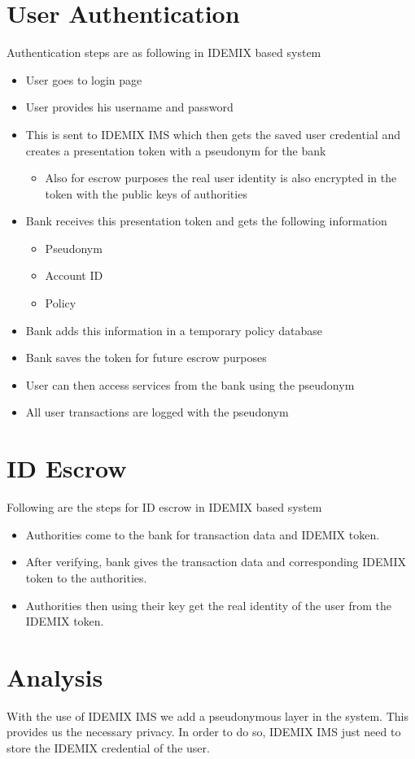 \section{User Authentication}
Authentication steps are as following in IDEMIX based system
\begin{itemize}
	\item User goes to login page
	\item User provides his username and password
	\item This is sent to IDEMIX IMS which then gets the saved user credential and creates a presentation token with a pseudonym for the bank
	\begin{itemize}
		\item Also for escrow purposes the real user identity is also encrypted in the token with the public keys of authorities
	\end{itemize}
	\item Bank receives this presentation token and gets the following information
	\begin{itemize}
		\item Pseudonym
		\item Account ID
		\item Policy
	\end{itemize}
	\item Bank adds this information in a temporary policy database
	\item Bank saves the token for future escrow purposes
	\item User can then access services from the bank using the pseudonym
	\item All user transactions are logged with the pseudonym
\end{itemize}
\section{ID Escrow}
Following are the steps for ID escrow in IDEMIX based system
\begin{itemize}
	\item Authorities come to the bank for transaction data and IDEMIX token.
	\item After verifying, bank gives the transaction data and corresponding IDEMIX token to the authorities.
	\item Authorities then using their key get the real identity of the user from the IDEMIX token.
\end{itemize}
\section{Analysis}
With the use of IDEMIX IMS we add a pseudonymous layer in the system. This provides us the necessary privacy. In order to do so, IDEMIX IMS just need to store the IDEMIX credential of the user. 

